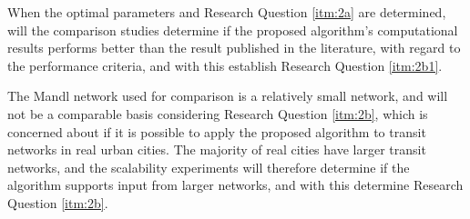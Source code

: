 When the optimal parameters and Research Question \vref{itm:2a} are determined, will the comparison studies determine if the proposed algorithm's computational results performs better than the result published in the literature, with regard to the performance criteria, and with this establish Research Question \vref{itm:2b1}. %

The Mandl network used for comparison is a relatively small network, and will not be a comparable basis considering Research Question \vref{itm:2b}, which is concerned about if it is possible to apply the proposed algorithm to transit networks in real urban cities. The majority of real cities have larger transit networks, and the scalability experiments will therefore determine if the algorithm supports input from larger networks, and with this determine Research Question \vref{itm:2b}.


